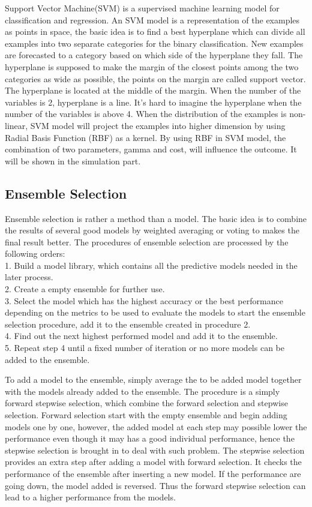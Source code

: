 \documentclass[12pt, a4paper, bibliography=totoc, english]{scrartcl}
\begin{document}
Support Vector Machine(SVM) is a supervised machine learning model for classification and regression.  An SVM model is a representation of the examples as points in space, the basic idea is to find a best hyperplane which can divide all examples into two separate categories for the binary classification. New examples are forecasted to a category based on which side of the hyperplane they fall. The hyperplane is supposed to make the margin of the closest points among the two categories as wide as possible, the points on the margin are called support vector. The hyperplane is located at the middle of the margin.  When the number of the variables is 2, hyperplane is a line. It's hard to imagine the hyperplane when the number of the variables is above 4.  When the distribution of the examples is non-linear, SVM model will project the examples into higher dimension by using Radial Basis Function (RBF) as a kernel.  By using RBF in SVM model, the combination of two parameters, gamma and cost, will influence the outcome. It will be shown in the simulation part.  

\subsection{Ensemble Selection}\label{ES}
Ensemble selection is rather a method than a model. The basic idea is to combine the results of several good models by weighted averaging or voting to makes the final result better.
The procedures of ensemble selection are processed by the following orders:\\
1.	Build a model library, which contains all the predictive models needed in the later process.\\
2.	Create a empty ensemble for further use.\\
3.	Select the model which has the highest accuracy or the best performance depending on the metrics to be used to evaluate the models to start the ensemble selection procedure, add it to the ensemble created in procedure 2.\\
4.	Find out the next highest performed model and add it to the ensemble.\\
5.	Repeat step 4 until a fixed number of iteration or no more models can be added to the ensemble.

To add a model to the ensemble, simply average the to be added model together with the models already added to the ensemble. The procedure is a simply forward stepwise selection, which combine the forward selection and stepwise selection. Forward selection start with the empty ensemble and begin adding models one by one, however, the added model at each step may possible lower the performance even though it may has a good individual performance, hence the stepwise selection is brought in to deal with such problem. The stepwise selection provides an extra step after adding a model with forward selection. It checks the performance of the ensemble after inserting a new model. If the performance are going down, the model added is reversed. Thus the forward stepwise selection can lead to a higher performance from the models.
\end{document}
